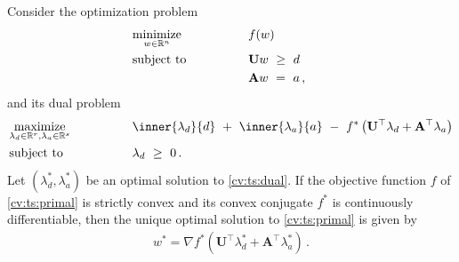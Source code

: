 
\begin{ftheorem}
  \label{cv:ts:th}
  Consider the optimization problem
\begin{align}
  \label{cv:ts:primal}
    &\underset{w \in \R^n}
    {\mathrm{minimize}}
    &&\qquad\qquad
    f(w)
    &&&
    \\
    \nonumber
    &\mathrm{subject}\ \mathrm{to} 
    &&\qquad\qquad
    \mathbf{U}w
    \ 
    \ge
    \ 
    d
    \\
    \nonumber
    &
    &&\qquad\qquad
    \mathbf{A}w
    \ 
    =
    \ 
    a
    \,,
\end{align}
and its dual problem
  \begin{alignat}{2}
    \label{cv:ts:dual}
    &\underset{
    \lambda_d \in \R^r
,
    \lambda_a \in \R^s
  }
    {\mathrm{maximize}}
    &&\qquad\qquad
    \inner
    {\lambda_d}
    {d}
    \ 
    +
    \ 
    \inner
    {\lambda_a}
    {a}
    \ 
    -
    \ 
    f^*
    \left( 
      \mathbf{U}^\top  \lambda_d
      +
      \mathbf{A}^\top  \lambda_a
    \right)
    \\
    \nonumber
    &\mathrm{subject}\ \mathrm{to} 
    &&\qquad\qquad
    \lambda_d
    \ 
    \ge
    \ 
    0
    \,.
\end{alignat}
  Let 
$
(\lambda_d^*,\lambda_a^*)
$
be an optimal solution to \eqref{cv:ts:dual}.
If the objective function $f$ of 
\eqref{cv:ts:primal} is strictly convex and its
convex conjugate $f^*$ is continuously differentiable,
then the unique optimal solution to 
\eqref{cv:ts:primal}
is given by
\begin{gather}
  w^*
  =
  \nabla
    f^*
    \left( 
      \mathbf{U}^\top  \lambda_d^*
      +
      \mathbf{A}^\top  \lambda_a^*
    \right)
    \,.
\end{gather}
\end{ftheorem}
